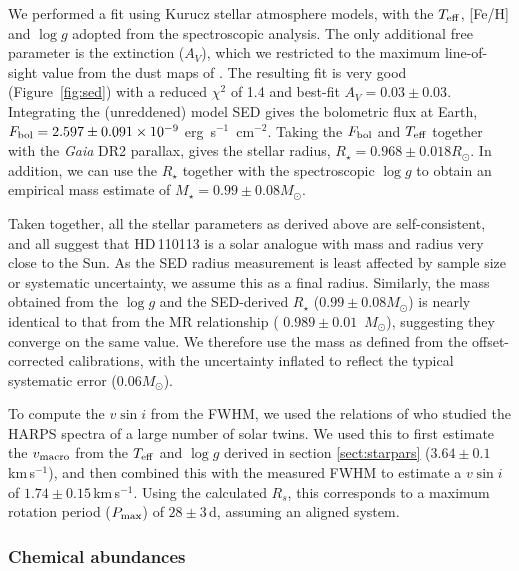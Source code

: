 \documentclass[fleqn,usenatbib]{mnras}
\newcommand{\harps}{{HARPS}}
\newcommand{\kms}{km\,s$^{-1}$}
\newcommand{\rstar}{\mbox{$R_{\star}$}}
\newcommand{\msun}{\mbox{$M_{\odot}$}}
\newcommand{\vsini}{$v\sin{i}$}
\newcommand{\teff}{$T_{\rm eff}$}
\newcommand{\feh}{\mbox{$\rm [Fe/H]$}}
\newcommand{\logg}{$\log g$}
\newcommand{\Tmstartorres}{ $ 0.989 \pm 0.01 $ }
\newcommand{\Tstar}{HD\,110113}
\begin{document}
We performed a fit using Kurucz stellar atmosphere models, with the $T_{\rm eff}$, [Fe/H] and $\log g$ adopted from the spectroscopic analysis. The only additional free parameter is the extinction ($A_V$), which we restricted to the maximum line-of-sight value from the dust maps of \citet{Schlegel:1998}. The resulting fit is very good (Figure~\ref{fig:sed}) with a reduced $\chi^2$ of 1.4 and best-fit $A_V = 0.03 \pm 0.03$. Integrating the (unreddened) model SED gives the bolometric flux at Earth, $F_{\rm bol} = 2.597 \pm 0.091 \times 10^{-9}$ erg~s$^{-1}$~cm$^{-2}$. Taking the $F_{\rm bol}$ and $T_{\rm eff}$ together with the {\it Gaia\/} DR2 parallax, gives the stellar radius, $R_\star = 0.968 \pm 0.018 R_\odot$. In addition, we can use the $R_\star$ together with the spectroscopic $\log g$ to obtain an empirical mass estimate of $M_\star = 0.99 \pm 0.08 M_\odot$.

Taken together, all the stellar parameters as derived above are self-consistent, and all suggest that \Tstar{} is a solar analogue with mass and radius very close to the Sun.
As the SED radius measurement is least affected by sample size or systematic uncertainty, we assume this as a final radius.
Similarly, the mass obtained from the \logg{} and the SED-derived \rstar{} ($0.99 \pm 0.08 M_\odot$) is nearly identical to that from the MR relationship (\Tmstartorres{}\,\msun{}), suggesting they converge on the same value.
We therefore use the mass as defined from the offset-corrected \citet{2010A&ARv..18...67T} calibrations, with the uncertainty inflated to reflect the typical systematic error ($0.06M_{\odot}$).

To compute the \vsini{} from the FWHM, we used the relations of \citet{dos2016solar} who studied the \harps{} spectra of a large number of solar twins.
We used this to first estimate the $v_{\rm macro}$ from the \teff{} and \logg{} derived in section \ref{sect:starpars} ($3.64\pm0.1$\,\kms{}), and then combined this with the measured FWHM to estimate a \vsini{} of $1.74\pm0.15$\,\kms{}.
Using the calculated $R_s$, this corresponds to a maximum rotation period ($P_{\rm max}$) of $28\pm3$\,d, assuming an aligned system.

\subsubsection{Chemical abundances} \label{sec:parameters}
\end{document}
